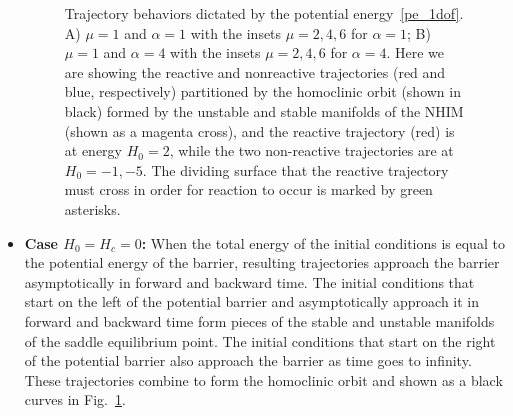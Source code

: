 \documentclass{ws-ijbc}
\begin{document}
\begin{itemize}
\begin{figure}[htbp]
\begin{center}
		\end{center}

		\caption{Trajectory behaviors dictated by the potential energy~\eqref{pe_1dof}. A) $\mu = 1$ and $\alpha = 1$ with the insets $\mu = 2,4,6$ for $\alpha = 1$; B) $\mu = 1$ and $\alpha = 4$ with the insets $\mu = 2,4,6$ for $\alpha = 4$. Here we are showing the reactive and nonreactive trajectories (red and blue, respectively) partitioned by the homoclinic orbit (shown in black) formed by the unstable and stable manifolds of the NHIM (shown as a magenta cross), and the reactive trajectory (red) is at energy $H_0 = 2$, while the two non-reactive trajectories are at $H_0 = -1 , -5$. The dividing surface that the reactive trajectory must cross in order for reaction to occur is marked by green asterisks.}
		\label{fig:saddlenodeham1dofparamset1}
	\end{figure}
	
	
	\item \textbf{Case $H_0 = H_c = 0$:} When the total energy of the initial conditions is equal to the potential energy of the barrier, resulting trajectories approach the barrier asymptotically in forward and backward time. The initial conditions that start on the left of the potential barrier and asymptotically approach it in forward and backward time form pieces of the stable and unstable manifolds of the saddle equilibrium point. The initial conditions that start on the right of the potential barrier also approach the barrier as time goes to infinity. These trajectories combine to form the homoclinic orbit and shown as a black curves in Fig.~\ref{fig:saddlenodeham1dofparamset1}.  
	

\end{itemize}
\end{document}
